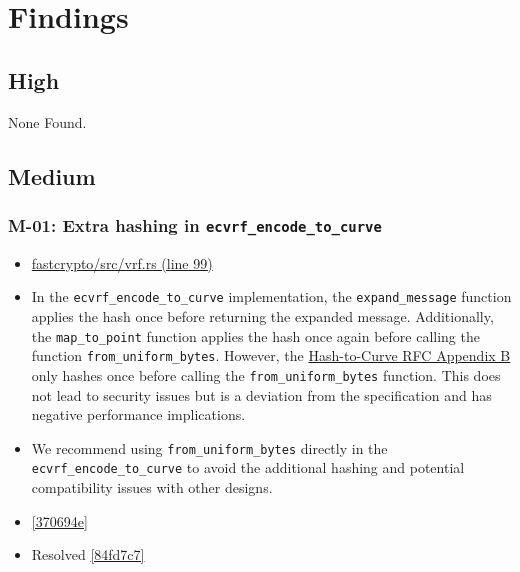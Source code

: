 \section{Findings}
\subsection{High}
    None Found.
\subsection{Medium}

\subsubsection*{M-01: Extra hashing in \lstinline{ecvrf_encode_to_curve}}
\begin{itemize}[align=left]
    \item[\textbf{Affected Code:}] \href{https://github.com/MystenLabs/fastcrypto/blob/963205c6d0538fe548b8b10037cf87a53af6f424/fastcrypto/src/vrf.rs#L99}{fastcrypto/src/vrf.rs (line 99)}
    \item[\textbf{Summary:}] In the \lstinline{ecvrf_encode_to_curve} implementation, the \lstinline{expand_message} function applies the hash once before returning the expanded message. Additionally, the \lstinline{map_to_point} function applies the hash once again before calling the function \lstinline{from_uniform_bytes}. However, the \href{https://datatracker.ietf.org/doc/html/draft-irtf-cfrg-hash-to-curve-16#name-hashing-to-ristretto255}{Hash-to-Curve RFC Appendix B} only hashes once before calling the \lstinline{from_uniform_bytes} function. This does not lead to security issues but is a deviation from the specification and has negative performance implications.
    \item[\textbf{Suggestion:}] We recommend using \lstinline{from_uniform_bytes} directly in the \lstinline{ecvrf_encode_to_curve} to avoid the additional hashing and potential compatibility issues with other designs.
    \item[\textbf{Suggested Fix:}] \href{https://github.com/MystenLabs/fastcrypto/pull/543/commits/370694eeffed74a57c816758d472640e4011ae7e}{[370694e]}
    \item[\textbf{Status:}] Resolved \href{https://github.com/MystenLabs/fastcrypto/commit/84fd7c7428c5f59185aecc56a2e0a006e8e07de1}{[84fd7c7]}
\end{itemize}

